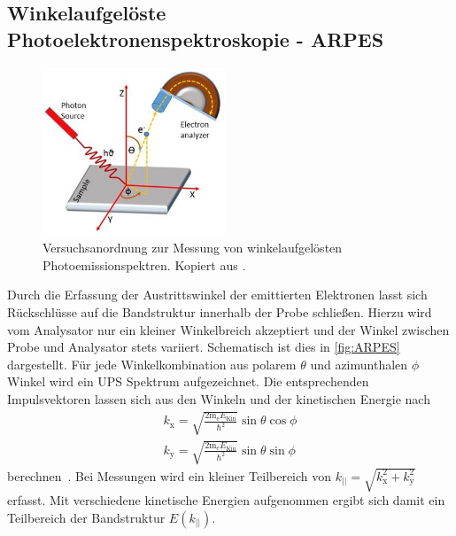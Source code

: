         \subsection{Winkelaufgelöste Photoelektronenspektroskopie - ARPES} \label{sec:ARPES}
            \begin{figure}
                \centering
                \includegraphics[height=5cm]{ARPES.jpg}
                \caption{Versuchsanordnung zur Messung von winkelaufgelösten Photoemissionspektren. Kopiert aus \cite{ARPES}.}
                \label{fig:ARPES}
            \end{figure}
            Durch die Erfassung der Austrittswinkel der emittierten Elektronen lasst sich Rückschlüsse auf die Bandstruktur innerhalb der Probe schließen.
            Hierzu wird vom Analysator nur ein kleiner Winkelbreich akzeptiert und der Winkel zwischen Probe und Analysator stets variiert.
            Schematisch ist dies in \autoref{fig:ARPES} dargestellt.
            Für jede Winkelkombination aus polarem $\theta$ und azimunthalen $\phi$ Winkel wird ein UPS Spektrum aufgezeichnet.
            Die entsprechenden Impulsvektoren lassen sich aus den Winkeln und der kinetischen Energie nach
            \begin{gather}
                k_\text{x} = \sqrt{\frac{2 \text{m}_\text{e} E_\text{Kin}}{\hbar^2}} \sin\theta \cos\phi \\
                k_\text{y} = \sqrt{\frac{2 \text{m}_\text{e} E_\text{Kin}}{\hbar^2}} \sin\theta \sin\phi
            \end{gather}
            berechnen~\cite{MM_4}.
            Bei Messungen wird ein kleiner Teilbereich von $k_\text{||} = \sqrt{k_\text{x}^2 + k_\text{y}^2}$ erfasst.
            Mit verschiedene kinetische Energien aufgenommen ergibt sich damit ein Teilbereich der Bandstruktur $E(k_\text{||})$.
